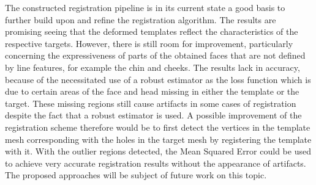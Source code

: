 The constructed registration pipeline is in its current state a good basis to further build upon and refine the registration algorithm. The results are promising seeing that the deformed templates reflect the characteristics of the respective targets. However, there is still room for improvement, particularly concerning the expressiveness of parts of the obtained faces that are not defined by line features, for example the chin and cheeks. The results lack in accuracy, because of the necessitated use of a robust estimator as the loss function which is
due to certain areas of the face and head missing in either the template or the target. These missing regions still cause artifacts in some cases of registration despite the fact that a robust estimator is used. A possible improvement of the registration scheme therefore would be to first detect the vertices in the template mesh corresponding with the holes in the target mesh by registering the template with it. With the outlier regions detected, the Mean Squared Error could be used to achieve very accurate registration results without the appearance of artifacts. The proposed approaches will be subject of future work on this topic.\\  

\begin{comment}
Tried out regularization
mount of basis functions
Adpation of the optimization scheme. 
squared exponential covariance function, for example to make it less smooth and give it a smaller domain.
The use of vector-valued Gaussian Processes can be further adapted to 3D face registration by either changing the covariance function or tweaking the parameters of the  Of course, the expressiveness and exact modelling in the feature regions of the fits has to be enhanced as
In order to the pipeline to yield near-perfect results Gaussian Process Regression and the optimization process have to be further adapted an improved. In essence, the imperative must be to find a good balance of parameter settings in the covariance function, the parametric representation of the Gaussian Process Posterior and the loss function.

In conclusion, the presented approach to 3D face registration successfully incorporated line features to establish correspondence which lead to more expressive and accurate registration results.

\end{comment}


